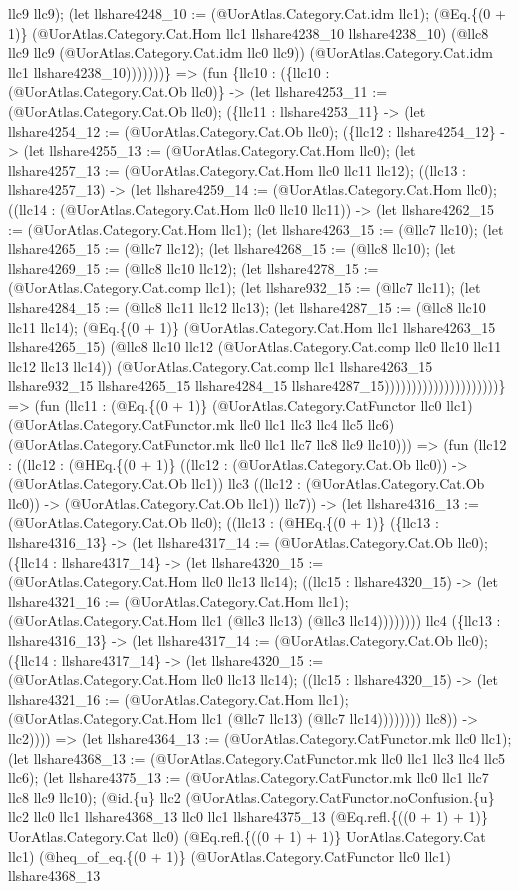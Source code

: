 \documentclass[11pt]{article}
\begin{document}
llc9 llc9); (let llshare4248\_10 := (@UorAtlas.Category.Cat.idm llc1); (@Eq.\{(0 + 1)\} (@UorAtlas.Category.Cat.Hom llc1 llshare4238\_10 llshare4238\_10) (@llc8 llc9 llc9 (@UorAtlas.Category.Cat.idm llc0 llc9)) (@UorAtlas.Category.Cat.idm llc1 llshare4238\_10)))))))\} => (fun \{llc10 : (\{llc10 : (@UorAtlas.Category.Cat.Ob llc0)\} -> (let llshare4253\_11 := (@UorAtlas.Category.Cat.Ob llc0); (\{llc11 : llshare4253\_11\} -> (let llshare4254\_12 := (@UorAtlas.Category.Cat.Ob llc0); (\{llc12 : llshare4254\_12\} -> (let llshare4255\_13 := (@UorAtlas.Category.Cat.Hom llc0); (let llshare4257\_13 := (@UorAtlas.Category.Cat.Hom llc0 llc11 llc12); ((llc13 : llshare4257\_13) -> (let llshare4259\_14 := (@UorAtlas.Category.Cat.Hom llc0); ((llc14 : (@UorAtlas.Category.Cat.Hom llc0 llc10 llc11)) -> (let llshare4262\_15 := (@UorAtlas.Category.Cat.Hom llc1); (let llshare4263\_15 := (@llc7 llc10); (let llshare4265\_15 := (@llc7 llc12); (let llshare4268\_15 := (@llc8 llc10); (let llshare4269\_15 := (@llc8 llc10 llc12); (let llshare4278\_15 := (@UorAtlas.Category.Cat.comp llc1); (let llshare932\_15 := (@llc7 llc11); (let llshare4284\_15 := (@llc8 llc11 llc12 llc13); (let llshare4287\_15 := (@llc8 llc10 llc11 llc14); (@Eq.\{(0 + 1)\} (@UorAtlas.Category.Cat.Hom llc1 llshare4263\_15 llshare4265\_15) (@llc8 llc10 llc12 (@UorAtlas.Category.Cat.comp llc0 llc10 llc11 llc12 llc13 llc14)) (@UorAtlas.Category.Cat.comp llc1 llshare4263\_15 llshare932\_15 llshare4265\_15 llshare4284\_15 llshare4287\_15)))))))))))))))))))))\} => (fun (llc11 : (@Eq.\{(0 + 1)\} (@UorAtlas.Category.CatFunctor llc0 llc1) (@UorAtlas.Category.CatFunctor.mk llc0 llc1 llc3 llc4 llc5 llc6) (@UorAtlas.Category.CatFunctor.mk llc0 llc1 llc7 llc8 llc9 llc10))) => (fun (llc12 : ((llc12 : (@HEq.\{(0 + 1)\} ((llc12 : (@UorAtlas.Category.Cat.Ob llc0)) -> (@UorAtlas.Category.Cat.Ob llc1)) llc3 ((llc12 : (@UorAtlas.Category.Cat.Ob llc0)) -> (@UorAtlas.Category.Cat.Ob llc1)) llc7)) -> (let llshare4316\_13 := (@UorAtlas.Category.Cat.Ob llc0); ((llc13 : (@HEq.\{(0 + 1)\} (\{llc13 : llshare4316\_13\} -> (let llshare4317\_14 := (@UorAtlas.Category.Cat.Ob llc0); (\{llc14 : llshare4317\_14\} -> (let llshare4320\_15 := (@UorAtlas.Category.Cat.Hom llc0 llc13 llc14); ((llc15 : llshare4320\_15) -> (let llshare4321\_16 := (@UorAtlas.Category.Cat.Hom llc1); (@UorAtlas.Category.Cat.Hom llc1 (@llc3 llc13) (@llc3 llc14)))))))) llc4 (\{llc13 : llshare4316\_13\} -> (let llshare4317\_14 := (@UorAtlas.Category.Cat.Ob llc0); (\{llc14 : llshare4317\_14\} -> (let llshare4320\_15 := (@UorAtlas.Category.Cat.Hom llc0 llc13 llc14); ((llc15 : llshare4320\_15) -> (let llshare4321\_16 := (@UorAtlas.Category.Cat.Hom llc1); (@UorAtlas.Category.Cat.Hom llc1 (@llc7 llc13) (@llc7 llc14)))))))) llc8)) -> llc2)))) => (let llshare4364\_13 := (@UorAtlas.Category.CatFunctor.mk llc0 llc1); (let llshare4368\_13 := (@UorAtlas.Category.CatFunctor.mk llc0 llc1 llc3 llc4 llc5 llc6); (let llshare4375\_13 := (@UorAtlas.Category.CatFunctor.mk llc0 llc1 llc7 llc8 llc9 llc10); (@id.\{u\} llc2 (@UorAtlas.Category.CatFunctor.noConfusion.\{u\} llc2 llc0 llc1 llshare4368\_13 llc0 llc1 llshare4375\_13 (@Eq.refl.\{((0 + 1) + 1)\} UorAtlas.Category.Cat llc0) (@Eq.refl.\{((0 + 1) + 1)\} UorAtlas.Category.Cat llc1) (@heq\_of\_eq.\{(0 + 1)\} (@UorAtlas.Category.CatFunctor llc0 llc1) llshare4368\_13 
\end{document}
